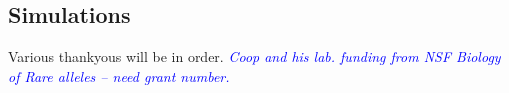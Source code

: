 \documentclass{pnastwo}
\newcommand{\jri}[1]{\textcolor{blue}{\emph{#1}} }
\begin{document}
\begin{article}
\begin{materials}


\subsection{Simulations}

\end{materials}

\begin{acknowledgments}
Various thankyous will be in order. \jri{Coop and his lab. funding from NSF Biology of Rare alleles -- need grant number.}
\end{acknowledgments}





\end{article}
\end{document}

